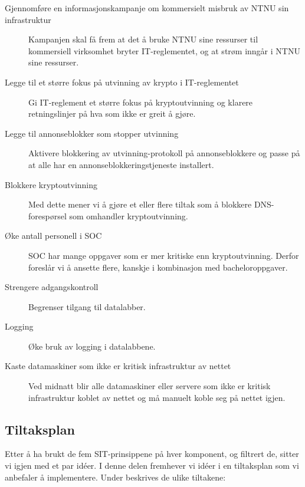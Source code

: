\begin{description}
\item[Gjennomføre en informasjonskampanje om kommersielt misbruk av NTNU sin infrastruktur] Kampanjen skal få frem at det å bruke NTNU sine ressurser til kommersiell virksomhet bryter IT-reglementet, og at strøm inngår i NTNU sine ressurser.
\item[Legge til et større fokus på utvinning av krypto i IT-reglementet] Gi IT-reglement et større fokus på kryptoutvinning og klarere retningslinjer på hva som ikke er greit å gjøre.
\item[Legge til annonseblokker som stopper utvinning] Aktivere blokkering av utvinning-protokoll på annonseblokkere og passe på at alle har en annonseblokkeringstjeneste installert.
\item[Blokkere kryptoutvinning] Med dette mener vi å gjøre et eller flere tiltak som å blokkere DNS-forespørsel som omhandler kryptoutvinning.  
\item[Øke antall personell i SOC] SOC har mange oppgaver som er mer kritiske enn kryptoutvinning. Derfor foreslår vi å ansette flere, kanskje i kombinasjon med bacheloroppgaver.
\item[Strengere adgangskontroll] Begrenser tilgang til datalabber. 
\item[Logging] Øke bruk av logging  i datalabbene. 
\item[Kaste datamaskiner som ikke er kritisk infrastruktur av nettet] Ved midnatt blir alle datamaskiner eller servere som ikke er kritisk infrastruktur koblet av nettet og må manuelt koble seg på nettet igjen.
\end{description}

\subsection{Tiltaksplan}
Etter å ha brukt de fem SIT-prinsippene på hver komponent, og filtrert de, sitter vi igjen med et par idéer. I denne delen fremhever vi idéer i en tiltaksplan som vi anbefaler å implementere. 
Under beskrives de ulike tiltakene:

